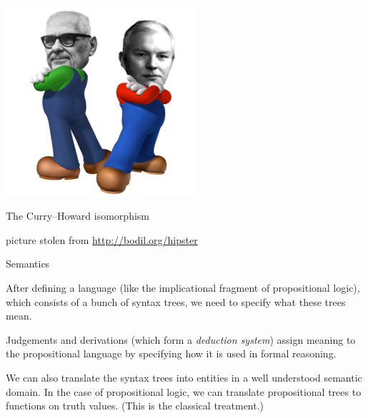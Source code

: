 \documentclass[t,compress,hyperref={hidelinks}]{beamer}
\begin{document}
\begin{frame}

\begin{center}

\vspace*{\fill}

\includegraphics[height=200pt]{church-curry.png}

\color{OxfordOlive}\LARGE The Curry--Howard isomorphism

\vspace*{\fill}

\tiny\color{gray} picture stolen from \url{http://bodil.org/hipster}

\end{center}

\end{frame}

\begin{frame}{Semantics}

After defining a language (like the implicational fragment of propositional logic), which consists of a bunch of syntax trees, we need to specify what these trees mean.

Judgements and derivations (which form a \emph{deduction system}) assign meaning to the propositional language by specifying how it is used in formal reasoning.

We can also translate the syntax trees into entities in a well understood semantic domain.
In the case of propositional logic, we can translate propositional trees to functions on truth values. (This is the classical treatment.)

\end{frame}
\end{document}
